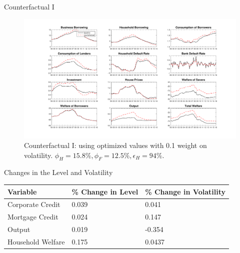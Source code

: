 \documentclass[8pt,aspectratio=169]{beamer}
\numberwithin{equation}{section}
\begin{document}
\begin{frame}{Counterfactual I}
\begin{figure}[H]
\centering
\caption{Counterfactual I: using optimized values  with 0.1 weight on volatility. $\phi_H=15.8 \%, \phi_F=12.5 \%, \epsilon_H=94 \%$.}
\includegraphics[scale=0.25]{counterfactuals2.pdf}
\end{figure}
\end{frame}




\begin{frame}{Changes in the Level and Volatility}

\begin{table}[h]

\begin{tabular}{l|l|l}
Variable & \% Change in Level & \% Change in Volatility \\
\hline
\hline
    Corporate Credit           &       0.039    &      0.041 \\
    Mortgage Credit            &      0.024    &       0.147 \\
    Output         &     0.019    &    -0.354 \\ 
    Household Welfare       &     0.175     &     0.0437\\
\end{tabular}
\end{table}


\end{frame}
\end{document}
